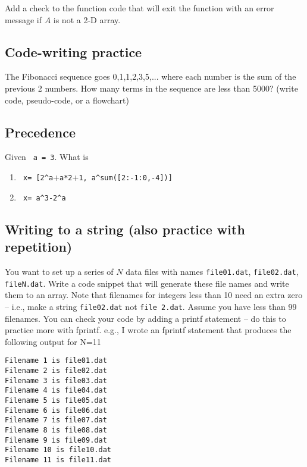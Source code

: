 \documentclass[letterpaper]{article}
\begin{document}
\vspace{4 in}


Add a check to the function code that will exit the function with an error message if $A$ is not a 2-D array.

\vspace{2in}

\newpage
\subsection {Code-writing practice}

\noindent The Fibonacci sequence goes 0,1,1,2,3,5,... where each number is the
sum of the previous 2 numbers. How many terms in the sequence are 
less than 5000? (write code, pseudo-code, or a flowchart)

\vspace{4 in}

\subsection {Precedence}

Given \verb+ a = 3+.  What is

\begin{enumerate}
\item \verb+ x= [2^a++\verb+a*2++\verb+1, a^sum([2:-1:0,-4])]+ 
\vspace{1.0in}
\item \verb+ x= a^3-2^a+
\vspace{1.0in}
\end{enumerate}

\newpage 
\subsection {Writing to a string (also practice with repetition)}

You want to set up a series of $N$ data files with names \verb+file01.dat+,  \verb+file02.dat+,  \verb+fileN.dat+.  Write a code snippet that will generate these file names and write them to an array.  Note that filenames for integers less than 10 need an extra zero -- i.e., make a string \verb+file02.dat+ not \verb+file 2.dat+.  Assume you have less than 99 filenames.  You can check your code by adding a printf statement -- do this to practice more with fprintf.  e.g., I wrote an fprintf statement that produces the following output for N=11

\begin{verbatim}
Filename 1 is file01.dat
Filename 2 is file02.dat
Filename 3 is file03.dat
Filename 4 is file04.dat
Filename 5 is file05.dat
Filename 6 is file06.dat
Filename 7 is file07.dat
Filename 8 is file08.dat
Filename 9 is file09.dat
Filename 10 is file10.dat
Filename 11 is file11.dat
\end{verbatim}
\end{document}
